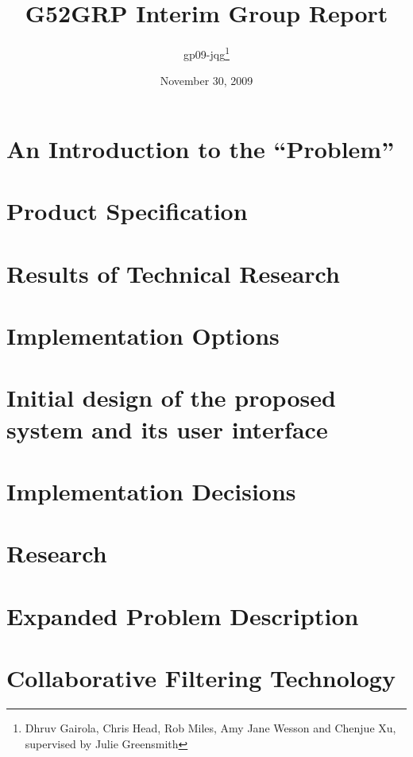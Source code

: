 \documentclass[12pt]{article}
\title{G52GRP Interim Group Report}                     %
\author{gp09-jqg\thanks{Dhruv Gairola, Chris Head, Rob Miles, Amy Jane Wesson and Chenjue Xu, supervised by Julie Greensmith}} %
\date{November 30, 2009}                                    %
\begin{document}
\maketitle                                              %

\tableofcontents
\newpage

\section{An Introduction to the ``Problem''}

\newpage

\section{Product Specification} 			%

\newpage


\section{Results of Technical Research}		%

\newpage

\section{Implementation Options}

\newpage

\section{Initial design of the proposed system and its user interface}

\newpage

\section{Implementation Decisions}

\newpage

\section{Research} %

\newpage

\section{Expanded Problem Description}

\newpage

\section{Collaborative Filtering Technology}

\newpage
\end{document}
